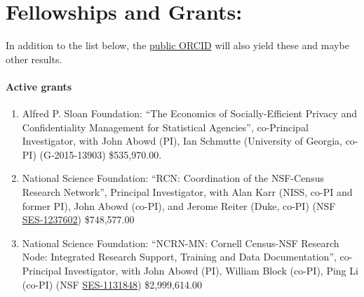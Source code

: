 \documentclass[12pt,letterpaper]{report}
\begin{document}
\section*{ Fellowships and Grants:}
In addition to the list below, the 
\href{http://orcid.org/0000-0001-5733-8932}{public ORCID} will also yield these and maybe other results.
\paragraph{Active grants}
\begin{enumerate}
\item Alfred P. Sloan Foundation: ``The Economics of Socially-Efficient Privacy and Confidentiality Management for Statistical Agencies'', co-Principal Investigator, with John Abowd (PI), Ian Schmutte (University of Georgia, co-PI) (G‐2015‐13903) \$535,970.00.

\item National Science Foundation: ``RCN: Coordination of the NSF-Census Research Network'', 
Principal Investigator, with Alan Karr (NISS, co-PI and former PI), John Abowd (co-PI), and 
Jerome Reiter (Duke, 
co-PI) (NSF \href{http://www.nsf.gov/awardsearch/showAward.do?AwardNumber=1237602}{SES-1237602}) \$748,577.00

\item National Science Foundation: ``NCRN-MN: Cornell Census-NSF Research Node: Integrated Research Support, Training and Data Documentation'', co-Principal Investigator, with John Abowd (PI), William Block (co-PI), Ping Li (co-PI) (NSF \href{http://www.nsf.gov/awardsearch/showAward.do?AwardNumber=1131848}{SES-1131848}) \$2,999,614.00
\end{enumerate}
\end{document}
